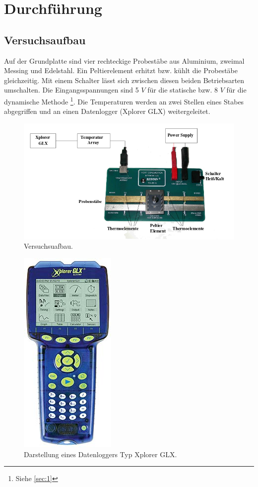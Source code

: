 \section{Durchführung}
\subsection{Versuchsaufbau}
Auf der Grundplatte sind vier rechteckige Probestäbe aus Aluminium, zweimal Messing
und Edelstahl. Ein Peltierelement erhitzt bzw. kühlt die Probestäbe gleichzeitig.
Mit einem Schalter lässt sich zwischen diesen beiden Betriebsarten umschalten.
Die Eingangsspannungen sind 5 $\textit{V}$ für die statische bzw. 8 $\textit{V}$
für die dynamische Methode \footnote{Siehe \ref{sec:1}}. Die Temperaturen werden
an zwei Stellen eines Stabes abgegriffen und an einen Datenlogger (Xplorer GLX)
weitergeleitet.
\begin{figure}[t]
  \centering
  \includegraphics[scale=0.5]{versuchsaufbau.png}
  \caption{Versuchsuafbau.}
  \label{fig:2}
\end{figure}
\begin{figure}
  \centering
  \includegraphics[scale=0.5]{xplorer_glx.jpg}
  \caption{Darstellung eines Datenloggers Typ Xplorer GLX.}
  \label{fig:1}
\end{figure}
